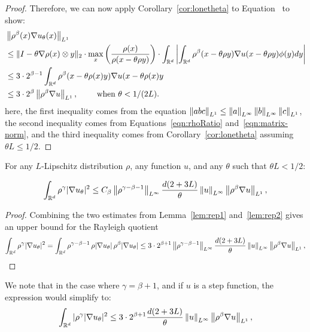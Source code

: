 \begin{proof}
 Therefore, we can now apply Corollary~\ref{cor:lonetheta}
 to Equation~ to show:
  \begin{align}
  \nonumber 
  & \left\lVert \rho^\beta(x) \nabla u_\theta(x) \right\rVert_{L^1} 
  \\  \nonumber
  & \leq \|I - \theta \nabla \rho(x) \otimes y\|_2
  \cdot \max_x\left(\frac{\rho(x)}{\rho(x - \theta \rho
        y)}\right) \cdot
  \int_{\mathbb{R}^d} \left| \int_{\mathbb{R}^d} \rho^{\beta}(x - \theta \rho y) \nabla u(x - \theta \rho y)
    \phi(y) dy \right|
  \\ \nonumber 
  & \leq 3 \cdot 2^{\beta - 1} \int_{\mathbb{R}^d} \rho^\beta(x -
      \theta \rho(x) y) \nabla u (x - \theta \rho (x) y 
  \\ \nonumber
  & 
  \leq 3 \cdot 2^\beta \left\lVert \rho^\beta \nabla u \right\rVert_{L^1},
  \qquad \text{ when } \theta < 1 / (2L).
  \end{align}
  here, the first inequality comes from the equation $\left\lVert abc \right\rVert_{L^1}
  \leq \left\lVert a \right\rVert_{{L^\infty}}\left\lVert b \right\rVert_{{L^\infty}}\left\lVert c \right\rVert_{L^1}$, the second inequality comes
  from Equations~\ref{eqn:rhoRatio} and~\ref{eqn:matrix-norm}, and the
  third inequality comes
  from Corollary~\ref{cor:lonetheta} assuming $\theta L \leq
  1/2$. 
  \end{proof}

  \begin{lemma}\label{lem:num}
  For any $L$-Lipschitz distribution $\rho$, any function $u$, and any $\theta$ such that $\theta L <
  1/2$:

  \begin{align}
  \int_{\mathbb{R}^d} \rho^\gamma |\nabla u_\theta|^2
  \leq  C_\beta \left\lVert \rho^{\gamma-\beta-1} \right\rVert_{{L^\infty}} \frac{d(2+3L)}{\theta} 
  \left\lVert u \right\rVert_{{L^\infty}} \left\lVert \rho^\beta \nabla u \right\rVert_{L^1},
  \end{align}
  \end{lemma}

  \begin{proof}
  Combining the two estimates from Lemma~\ref{lem:rep1}
  and~\ref{lem:rep2} gives an upper bound for the Rayleigh
  quotient 
  \begin{align}
  \int_{\mathbb{R}^d} \rho^\gamma |\nabla u_\theta|^2
  = \int_{\mathbb{R}^d} \rho^{\gamma-\beta-1} \,
  \rho |\nabla u_\theta| \, \rho^\beta |\nabla u_\theta|
  \leq 3 \cdot 2^{\beta + 1} \left\lVert \rho^{\gamma-\beta-1} \right\rVert_{{L^\infty}} \frac{d(2+3L)}{\theta} 
  \left\lVert u \right\rVert_{{L^\infty}} \left\lVert \rho^\beta \nabla u \right\rVert_{L^1},
  \end{align}
  \end{proof}

  We note that in the case where $\gamma = \beta + 1$, and if $u$ is a step
  function, the expression would
  simplify to:
  \[ \int_{\mathbb{R}^d}
  |\rho^{\gamma} |\nabla u_\theta|^2
  \leq 3 \cdot 2^{\beta + 1} \frac{d(2+3L)}{\theta} 
  \left\lVert u \right\rVert_{{L^\infty}} \left\lVert \rho^\beta \nabla u \right\rVert_{L^1},
  \]
